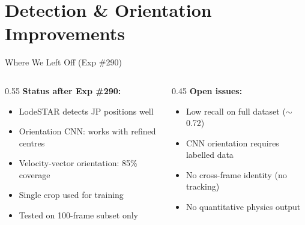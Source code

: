 
\section[Detection Improvements]{Detection \& Orientation Improvements}

\begin{frame}{Where We Left Off (Exp \#290)}
\begin{columns}
\begin{column}{0.55\textwidth}
\textbf{Status after Exp \#290:}
\begin{itemize}\small
    \item LodeSTAR detects JP positions well
    \item Orientation CNN: works with refined centres
    \item Velocity-vector orientation: 85\% coverage
    \item Single crop used for training
    \item Tested on 100-frame subset only
\end{itemize}
\end{column}
\begin{column}{0.45\textwidth}
\textbf{Open issues:}
\begin{itemize}\small
    \item Low recall on full dataset ($\sim$0.72)
    \item CNN orientation requires labelled data
    \item No cross-frame identity (no tracking)
    \item No quantitative physics output
\end{itemize}
\end{column}
\end{columns}
\end{frame}

